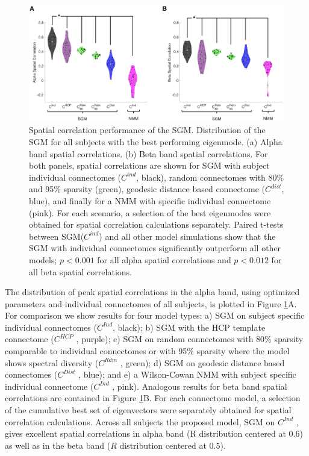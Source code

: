 \begin{figure}[htbp]
    \centering
    \includegraphics[width=\textwidth]{../figures/chapter5/fig7_spatial.png}
    \caption{Spatial correlation performance of the SGM. Distribution of the SGM for all subjects with the best performing eigenmode. (a) Alpha band spatial correlations. (b) Beta band spatial correlations. For both panels, spatial correlations are shown for SGM with subject individual connectomes ($C^{ind}$, black), random connectomes with 80\% and 95\% sparsity (green), geodesic distance based connectome ($C^{dist}$, blue), and finally for a NMM with specific individual connectome (pink). For each scenario, a selection of the best eigenmodes were obtained for spatial correlation calculations separately. Paired t-tests between SGM($C^{ind}$) and all other model simulations show that the SGM with individual connectomes significantly outperform all other models; $p < 0.001$ for all alpha spatial correlations and $p < 0.012$ for all beta spatial correlations.}
    \label{fig:spatial}
\end{figure}

The distribution of peak spatial correlations in the alpha band, using
optimized parameters and individual connectomes of all subjects, is
plotted in Figure \ref{fig:spatial}A. For comparison we show results for four
model types: a) SGM on subject specific individual
connectomes ($C^{Ind}$, black); b) SGM with the HCP
template connectome ($C^{HCP}$ , purple); c) SGM on random
connectomes with 80\% sparsity comparable to individual connectomes or
with 95\% sparsity where the model shows spectral diversity
($C^{Rdm}$ , green); d) SGM on geodesic distance based
connectomes ($C^{Dist}$ , blue); and e) a Wilson-Cowan
NMM with subject specific individual connectome
($C^{Ind}$ , pink). Analogous results for beta band spatial
correlations are contained in Figure \ref{fig:spatial}B. For each connectome
model, a selection of the cumulative best set of eigenvectors were
separately obtained for spatial correlation calculations. Across all
subjects the proposed model, SGM on $C^{Ind}$ , gives
excellent spatial correlations in alpha band (R distribution centered at
0.6) as well as in the beta band ($R$ distribution centered at 0.5).

